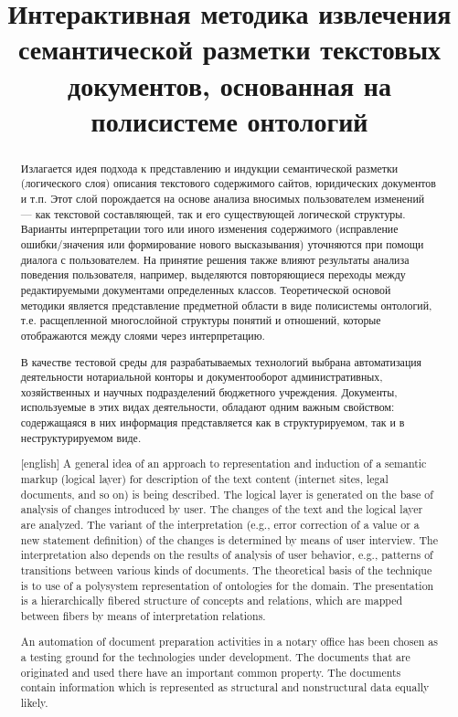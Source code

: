 \documentclass[utf8]{../IncArticle}
\title{Интерактивная методика извлечения семантической разметки
  текстовых документов, основанная на полисистеме онтологий}
\date{}
\begin{document}
\begin{abstract}

  Излагается идея подхода к представлению и индукции семантической
  разметки (логического слоя) описания текстового содержимого сайтов,
  юридических документов и т.п.  Этот слой порождается на основе
  анализа вносимых пользователем изменений --- как текстовой
  составляющей, так и его существующей логической структуры.  Варианты
  интерпретации того или иного изменения содержимого (исправление
  ошибки/значения или формирование нового высказывания) уточняются при
  помощи диалога с пользователем.  На принятие решения также влияют
  результаты анализа поведения пользователя, например, выделяются
  повторяющиеся переходы между редактируемыми документами определенных
  классов.  Теоретической основой методики является представление
  предметной области в виде полисистемы онтологий, т.е. расщепленной
  многослойной структуры понятий и отношений, которые отображаются
  между слоями через интерпретацию.

  В качестве тестовой среды для разрабатываемых технологий выбрана
  автоматизация деятельности нотариальной конторы и документооборот
  административных, хозяйственных и научных подразделений бюджетного
  учреждения.  Документы, используемые в этих видах деятельности,
  обладают одним важным свойством: содержащаяся в них информация
  представляется как в структурируемом, так и в неструктурируемом
  виде.

\end{abstract}

\begin{abstract}[english]
  A general idea of an approach to representation and induction of a
  semantic markup (logical layer) for description of the text content
  (internet sites, legal documents, and so on) is being described.
  The logical layer is generated on the base of analysis of changes
  introduced by user.  The changes of the text and the logical layer
  are analyzed.  The variant of the interpretation (e.g., error
  correction of a value or a new statement definition) of the changes
  is determined by means of user interview.  The interpretation also
  depends on the results of analysis of user behavior, e.g., patterns
  of transitions between various kinds of documents.  The theoretical
  basis of the technique is to use of a polysystem representation of
  ontologies for the domain.  The presentation is a hierarchically
  fibered structure of concepts and relations, which are mapped
  between fibers by means of interpretation relations.

  An automation of document preparation activities in a notary office
  has been chosen as a testing ground for the technologies under
  development.  The documents that are originated and used there have
  an important common property.  The documents contain information
  which is represented as structural and nonstructural data equally
  likely.

\end{abstract}
\end{document}
